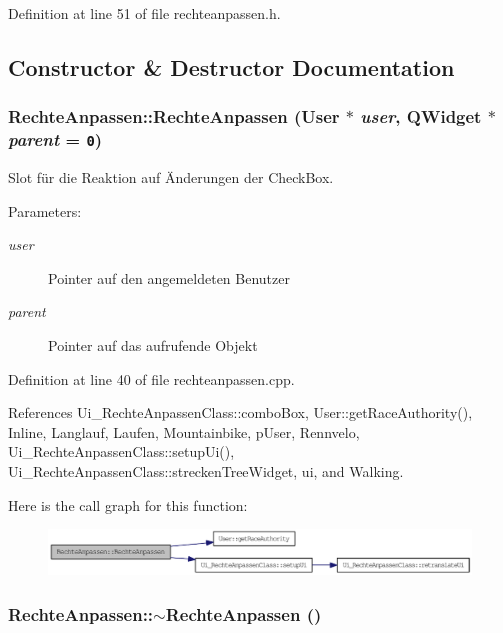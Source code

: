 Definition at line 51 of file rechteanpassen.h.

\subsection{Constructor \& Destructor Documentation}
\hypertarget{class_rechte_anpassen_aef2a4160afa6afb2bdc2040f01e92ce}{
\subsubsection[RechteAnpassen]{\setlength{\rightskip}{0pt plus 5cm}RechteAnpassen::RechteAnpassen ({\bf User} $\ast$ {\em user}, \/  QWidget $\ast$ {\em parent} = {\tt 0})}}
\label{class_rechte_anpassen_aef2a4160afa6afb2bdc2040f01e92ce}


Slot für die Reaktion auf Änderungen der CheckBox. 

\begin{Desc}
\item[Parameters:]
\begin{description}
\item[{\em user}]Pointer auf den angemeldeten Benutzer \item[{\em parent}]Pointer auf das aufrufende Objekt \end{description}
\end{Desc}


Definition at line 40 of file rechteanpassen.cpp.

References Ui\_\-RechteAnpassenClass::comboBox, User::getRaceAuthority(), Inline, Langlauf, Laufen, Mountainbike, pUser, Rennvelo, Ui\_\-RechteAnpassenClass::setupUi(), Ui\_\-RechteAnpassenClass::streckenTreeWidget, ui, and Walking.

Here is the call graph for this function:\nopagebreak
\begin{figure}[H]
\begin{center}
\leavevmode
\includegraphics[width=323pt]{class_rechte_anpassen_aef2a4160afa6afb2bdc2040f01e92ce_cgraph}
\end{center}
\end{figure}
\hypertarget{class_rechte_anpassen_e520e6bb6a291ce8db7fb9ff08f18ecf}{
\subsubsection[$\sim$RechteAnpassen]{\setlength{\rightskip}{0pt plus 5cm}RechteAnpassen::$\sim$RechteAnpassen ()}}
\label{class_rechte_anpassen_e520e6bb6a291ce8db7fb9ff08f18ecf}


